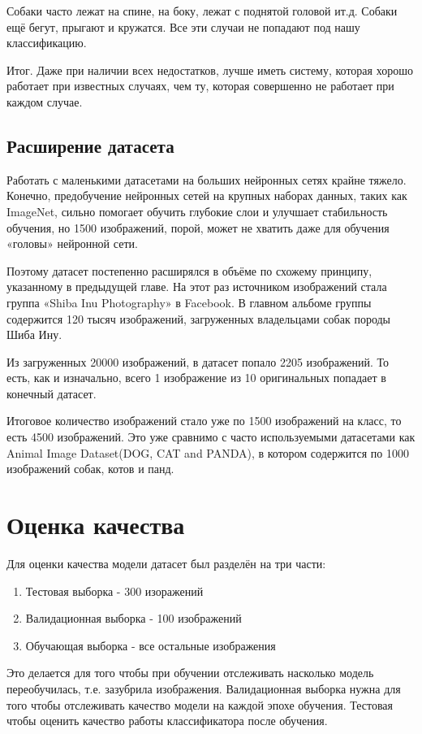 Собаки часто лежат на спине, на боку, лежат с поднятой головой ит.д. Собаки ещё бегут, прыгают и кружатся. Все эти случаи не попадают под нашу классификацию.


Итог. Даже при наличии всех недостатков, лучше иметь систему, которая хорошо работает при известных случаях, чем ту, которая совершенно не работает при каждом случае. \cite{karpathy}


\subsection{Расширение датасета}\label{sect3_3_2}
Работать с маленькими датасетами на больших нейронных сетях крайне тяжело. Конечно, предобучение нейронных сетей на крупных наборах данных, таких как ImageNet, сильно помогает обучить глубокие слои и улучшает стабильность обучения, но 1500 изображений, порой, может не хватить даже для обучения «головы» нейронной сети.

Поэтому датасет постепенно расширялся в объёме по схожему принципу, указанному в предыдущей главе. На этот раз источником изображений стала группа «Shiba Inu Photography» в Facebook. В главном альбоме группы содержится 120 тысяч изображений, загруженных владельцами собак породы Шиба Ину.

Из загруженных 20000 изображений, в датасет попало 2205 изображений. То есть, как и изначально, всего 1 изображение из 10 оригинальных попадает в конечный датасет.

Итоговое количество изображений стало уже по 1500 изображений на класс, то есть 4500 изображений. Это уже сравнимо с часто используемыми датасетами как Animal Image Dataset(DOG, CAT and PANDA), в котором содержится по 1000 изображений собак, котов и панд. 


\section{Оценка качества} \label{quality}
Для оценки качества модели датасет был разделён на три части: 
\begin{enumerate}
    \item Тестовая выборка - 300 изоражений
    \item Валидационная выборка - 100 изображений
    \item Обучающая выборка - все остальные изображения
\end{enumerate}

Это делается для того чтобы при обучении отслеживать насколько модель переобучилась, т.е. зазубрила изображения. Валидационная выборка нужна для того чтобы отслеживать качество модели на каждой эпохе обучения. Тестовая чтобы оценить качество работы классификатора после обучения.

